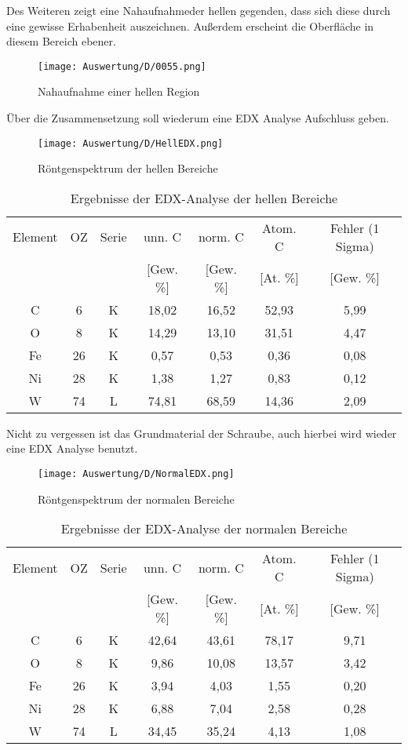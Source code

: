 \newpage
Des Weiteren zeigt eine Nahaufnahmeder hellen gegenden, dass sich diese durch eine gewisse Erhabenheit auszeichnen. Außerdem erscheint die Oberfläche in diesem Bereich ebener.
\begin{figure}[h]
    \centering
    \texttt{[image: Auswertung/D/0055.png]}
    \caption{Nahaufnahme einer hellen Region}
\end{figure}

\newpage
Über die Zusammensetzung soll wiederum eine EDX Analyse Aufschluss geben.
\begin{figure}[h]
    \centering
    \texttt{[image: Auswertung/D/HellEDX.png]}
    \caption{Röntgenspektrum der hellen Bereiche}
\end{figure}



\begin{table}[h]
    \centering
    \begin{tabular}{c|c|c|c|c|c|c}
        Element & OZ &Serie& unn. C & norm. C &  Atom. C  & Fehler (1 Sigma) \\
         & & & [Gew. \%] & [Gew. \%] & [At. \%] & [Gew. \%] \\
        \hline\hline
        C & 6 & K & 18,02 & 16,52 & 52,93 & 5,99\\
        O & 8 & K & 14,29 & 13,10 & 31,51 & 4,47\\
        Fe & 26 & K & 0,57 & 0,53 & 0,36 & 0,08\\
        Ni & 28 & K & 1,38 & 1,27 & 0,83 & 0,12\\
        W & 74 & L & 74,81 & 68,59 & 14,36 & 2,09
    \end{tabular}
    \caption{Ergebnisse der EDX-Analyse der hellen Bereiche}
\end{table}

\newpage
Nicht zu vergessen ist das Grundmaterial der Schraube, auch hierbei wird wieder eine EDX Analyse benutzt.
\begin{figure}[h]
    \centering
    \texttt{[image: Auswertung/D/NormalEDX.png]}
    \caption{Röntgenspektrum der normalen Bereiche}
\end{figure}


\begin{table}[h]
    \centering
    \begin{tabular}{c|c|c|c|c|c|c}
        Element & OZ &Serie& unn. C & norm. C &  Atom. C  & Fehler (1 Sigma) \\
         & & & [Gew. \%] & [Gew. \%] & [At. \%] & [Gew. \%] \\
        \hline\hline
        C & 6 & K & 42,64 & 43,61 & 78,17 & 9,71\\
        O & 8 & K & 9,86 & 10,08 & 13,57 & 3,42\\
        Fe & 26 & K & 3,94 & 4,03 & 1,55 & 0,20\\
        Ni & 28 & K & 6,88 & 7,04 & 2,58 & 0,28\\
        W & 74 & L & 34,45 & 35,24 & 4,13 & 1,08
    \end{tabular}
    \caption{Ergebnisse der EDX-Analyse der normalen Bereiche}
\end{table}

